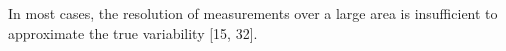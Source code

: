 \documentclass[twoside,twocolumn]{article}
\begin{document}
 In most cases, the resolution of measurements over a large area is insufficient to
approximate the true variability [15, 32].




\end{document}
